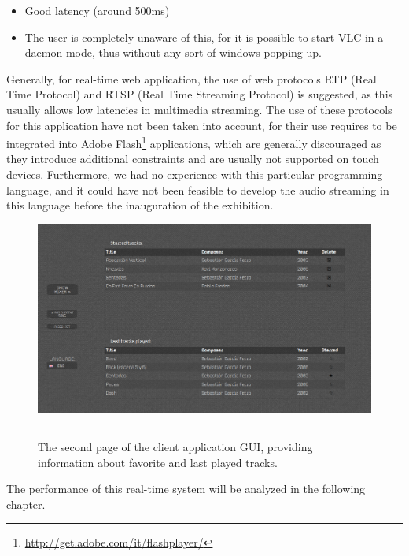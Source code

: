 \begin{itemize}
\item Good latency (around 500ms)
\item The user is completely unaware of this, for it is possible to start VLC in a daemon mode, thus without any sort of windows popping up. 
\end{itemize}
Generally, for real-time web application, the use of web protocols RTP (Real Time Protocol) and RTSP (Real Time Streaming Protocol) is suggested, as this usually allows low latencies in multimedia streaming. The use of these protocols for this application have not been taken into account, for their use requires to be integrated into Adobe Flash\footnote{\url{http://get.adobe.com/it/flashplayer/}} applications, which are generally discouraged as they introduce additional constraints and are usually not supported on touch devices. Furthermore, we had no experience with this particular programming language, and it could have not been feasible to develop the audio streaming in this language before the inauguration of the exhibition.

\begin{figure}[h]
\hskip -0.4cm
\includegraphics[scale=0.32]{Figures/gui2.png}
    \rule{27em}{0.5pt}
  \caption[The second page of the user interface]{The second page of the client application GUI, providing information about favorite and last played tracks.}
  \label{fig:gui2}
\end{figure}

The performance of this real-time system will be analyzed in the following chapter.